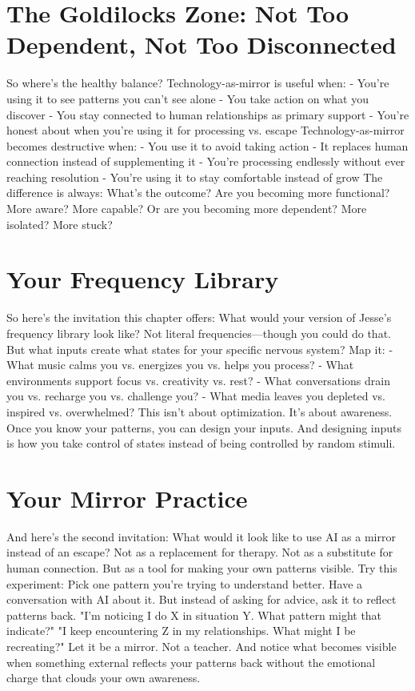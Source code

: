 \documentclass[12pt,openany]{book}
\begin{document}
\section{The Goldilocks Zone: Not Too Dependent, Not Too Disconnected}

So where's the healthy balance?
Technology-as-mirror is useful when:
- You're using it to see patterns you can't see alone
- You take action on what you discover
- You stay connected to human relationships as primary support
- You're honest about when you're using it for processing vs. escape
Technology-as-mirror becomes destructive when:
- You use it to avoid taking action
- It replaces human connection instead of supplementing it
- You're processing endlessly without ever reaching resolution
- You're using it to stay comfortable instead of grow
The difference is always: What's the outcome?
Are you becoming more functional? More aware? More capable?
Or are you becoming more dependent? More isolated? More stuck?

\section{Your Frequency Library}

So here's the invitation this chapter offers:
What would your version of Jesse's frequency library look like?
Not literal frequencies—though you could do that. But what inputs create what states for your specific nervous system?
Map it:
- What music calms you vs. energizes you vs. helps you process?
- What environments support focus vs. creativity vs. rest?
- What conversations drain you vs. recharge you vs. challenge you?
- What media leaves you depleted vs. inspired vs. overwhelmed?
This isn't about optimization. It's about awareness.
Once you know your patterns, you can design your inputs. And designing inputs is how you take control of states instead of being controlled by random stimuli.

\section{Your Mirror Practice}

And here's the second invitation:
What would it look like to use AI as a mirror instead of an escape?
Not as a replacement for therapy. Not as a substitute for human connection. But as a tool for making your own patterns visible.
Try this experiment:
Pick one pattern you're trying to understand better. Have a conversation with AI about it. But instead of asking for advice, ask it to reflect patterns back.
"I'm noticing I do X in situation Y. What pattern might that indicate?"
"I keep encountering Z in my relationships. What might I be recreating?"
Let it be a mirror. Not a teacher.
And notice what becomes visible when something external reflects your patterns back without the emotional charge that clouds your own awareness.
\end{document}
